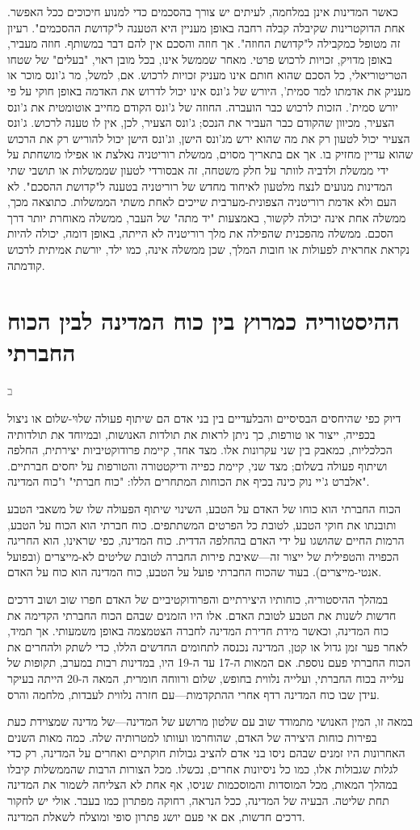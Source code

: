 \documentclass[12pt,oneside]{book}
\newcommand{\hebrewchapter}[2]{%
  \chapter*{#1}%
  \addcontentsline{toc}{chapter}{#1}%
  \lettrine[lines=4, lhang=0.1, loversize=0.5, findent=0pt]{\textcolor{gray} #2}{}%
}
\begin{document}
כאשר המדינות אינן במלחמה, לעיתים יש צורך בהסכמים כדי למנוע חיכוכים ככל האפשר. אחת הדוקטרינות שקיבלה קבלה רחבה באופן מעניין היא הטענה ל"קדושת ההסכמים". רעיון זה מטופל כמקבילה ל"קדושת החוזה". אך חוזה והסכם אין להם דבר במשותף. חוזה מעביר, באופן מדויק, זכויות לרכוש פרטי. מאחר שממשל אינו, בכל מובן ראוי, "בעלים" של שטחו הטריטוריאלי, כל הסכם שהוא חותם אינו מעניק זכויות לרכוש. אם, למשל, מר ג'ונס מוכר או מעניק את אדמתו למר סמית', היורש של ג'ונס אינו יכול לדרוש את האדמה באופן חוקי על פי יורש סמית'. הזכות לרכוש כבר הועברה. החוזה של ג'ונס הקודם מחייב אוטומטית את ג'ונס הצעיר, מכיוון שהקודם כבר העביר את הנכס; ג'ונס הצעיר, לכן, אין לו טענה לרכוש. ג'ונס הצעיר יכול לטעון רק את מה שהוא ירש מג'ונס הישן, וג'ונס הישן יכול להוריש רק את הרכוש שהוא עדיין מחזיק בו. אך אם בתאריך מסוים, ממשלת רוריטניה נאלצת או אפילו מושחתת על ידי ממשלת ולדביה לוותר על חלק משטחה, זה אבסורדי לטעון שממשלות או תושבי שתי המדינות מנועים לנצח מלטעון לאיחוד מחדש של רוריטניה בטענה ל"קדושת ההסכם". לא העם ולא אדמת רוריטניה הצפונית-מערבית שייכים לאחת משתי הממשלות. כתוצאה מכך, ממשלה אחת אינה יכולה לקשור, באמצעות "יד מתה" של העבר, ממשלה מאוחרת יותר דרך הסכם. ממשלה מהפכנית שהפילה את מלך רוריטניה לא הייתה, באופן דומה, יכולה להיות נקראת אחראית לפעולות או חובות המלך, שכן ממשלה אינה, כמו ילד, יורשת אמיתית לרכוש קודמתה.

\hebrewchapter{ההיסטוריה כמרוץ בין כוח המדינה לבין הכוח החברתי}{ב}
דיוק כפי שהיחסים הבסיסיים והבלעדיים בין בני אדם הם שיתוף פעולה שלוּי-שלום או ניצול בכפייה, ייצור או טורפות, כך ניתן לראות את תולדות האנושות, ובמיוחד את תולדותיה הכלכליות, כמאבק בין שני עקרונות אלו. מצד אחד, קיימת פרודוקטיביות יצירתית, החלפה ושיתוף פעולה בשלום; מצד שני, קיימת כפייה ודיקטטורה והטורפות על יחסים חברתיים. אלברט ג'יי נוק כינה בכיף את הכוחות המתחרים הללו: "כוח חברתי" ו"כוח המדינה".

הכוח החברתי הוא כוחו של האדם על הטבע, השינוי שיתוף הפעולה שלו של משאבי הטבע ותובנתו את חוקי הטבע, לטובת כל הפרטים המשתתפים. כוח חברתי הוא הכוח על הטבע, הרמות החיים שהושגו על ידי האדם בהחלפה הדדית. כוח המדינה, כפי שראינו, הוא החריגה הכפויה והטפילית של ייצור זה—שאיבת פירות החברה לטובת שליטים לא-מייצרים (ובפועל אנטי-מייצרים). בעוד שהכוח החברתי פועל על הטבע, כוח המדינה הוא כוח על האדם.

במהלך ההיסטוריה, כוחותיו היצירתיים והפרודוקטיביים של האדם חפרו שוב ושוב דרכים חדשות לשנות את הטבע לטובת האדם. אלו היו הזמנים שבהם הכוח החברתי הקדימה את כוח המדינה, וכאשר מידת חדירת המדינה לחברה הצטמצמה באופן משמעותי. אך תמיד, לאחר פער זמן גדול או קטן, המדינה נכנסה לתחומים החדשים הללו, כדי לשתק ולהחרים את הכוח החברתי פעם נוספת. אם המאות ה-17 עד ה-19 היו, במדינות רבות במערב, תקופות של עלייה בכוח החברתי, ועלייה נלווית בחופש, שלום ורווחה חומרית, המאה ה-20 הייתה בעיקר עידן שבו כוח המדינה רדף אחרי ההתקדמות—עם חזרה נלווית לעבדות, מלחמה והרס.

במאה זו, המין האנושי מתמודד שוב עם שלטון מרושע של המדינה—של מדינה שמצוידת כעת בפירות כוחות היצירה של האדם, שהוחרמו ועוותו למטרותיה שלה. כמה מאות השנים האחרונות היו זמנים שבהם ניסו בני אדם להציב גבולות חוקתיים ואחרים על המדינה, רק כדי לגלות שגבולות אלו, כמו כל ניסיונות אחרים, נכשלו. מכל הצורות הרבות שהממשלות קיבלו במהלך המאות, מכל המוסדות והמוסכמות שניסו, אף אחת לא הצליחה לשמור את המדינה תחת שליטה. הבעיה של המדינה, ככל הנראה, רחוקה מפתרון כמו בעבר. אולי יש לחקור דרכים חדשות, אם אי פעם יושג פתרון סופי ומוצלח לשאלת המדינה.
\end{document}

